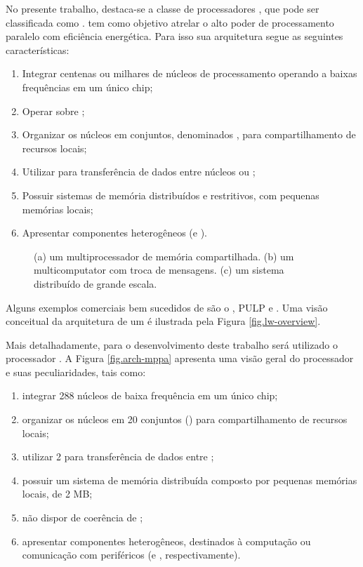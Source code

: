No presente trabalho, destaca-se a classe de processadores \lw, que pode ser classificada como \mpsoc. \Lws tem como objetivo atrelar o alto poder de processamento paralelo com eficiência energética. Para isso sua arquitetura segue as seguintes características:
\begin{enumerate}[label=(\roman*)]
    \item Integrar centenas ou milhares de núcleos de processamento operando a baixas frequências em um único chip;
    \item Operar sobre \mimd;
    \item Organizar os núcleos em conjuntos, denominados \clusters, para compartilhamento de recursos locais;
    \item Utilizar \nocs para transferência de dados entre núcleos ou \clusters;
    \item Possuir sistemas de memória distribuídos e restritivos, com pequenas memórias locais;
    \item Apresentar componentes heterogêneos (\cclusters e \ioclusters).
\end{enumerate}


\begin{figure}[bt]
    \centering
    
    \caption{(a) um multiprocessador de memória compartilhada. (b) um multicomputator com troca de mensagens. (c) um sistema distribuído de grande escala.\cite{tanenbaum:4ed}}\label{fig.mimd}
\end{figure}

Alguns exemplos comerciais bem sucedidos de \lws são o \mppa \cite{dinechin:2013}, PULP \cite{pulp} e \taihulight \cite{fu2016sunway}. Uma visão conceitual da arquitetura de um \lw é ilustrada pela Figura \ref{fig.lw-overview}.

Mais detalhadamente, para o desenvolvimento deste trabalho será utilizado o processador \mppa. A Figura \ref{fig.arch-mppa} apresenta uma visão geral do processador e suas peculiaridades, tais como:

\begin{enumerate}[label=(\roman*)]
    \item integrar 288 núcleos de baixa frequência em um único chip;
    \item organizar os núcleos em 20 conjuntos (\clusters) para compartilhamento de recursos locais;
    \item utilizar 2 \nocs para transferência de dados entre \clusters;
    \item possuir um sistema de memória distribuída composto por pequenas memórias locais, \eg  \sram de 2 MB;
    \item não dispor de coerência de \cache;
    \item apresentar componentes heterogêneos, \eg \clusters destinados à computação ou comunicação com periféricos (\cclusters e \ioclusters, respectivamente).
\end{enumerate}

